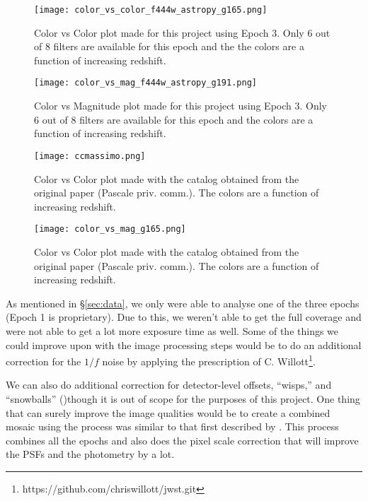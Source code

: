 \documentclass[twocolumn,linenumbers]{aastex631}
\newcommand{\todo}[1]{\texttt{TODO: #1}}
\begin{document}
\begin{figure}[h]
    \centering
    \texttt{[image: color\_vs\_color\_f444w\_astropy\_g165.png]}
    \caption{Color vs Color plot made for this project using Epoch 3. Only 6 out of 8 filters are available for this epoch and the the colors are a function of increasing redshift.}
    \label{fig:cc302}
\end{figure}

\begin{figure}[h]
    \centering
    \texttt{[image: color\_vs\_mag\_f444w\_astropy\_g191.png]}
    \caption{Color vs Magnitude plot made for this project using Epoch 3. Only 6 out of 8 filters are available for this epoch and the colors are a function of increasing redshift.}
    \label{fig:cm302}
\end{figure}

\begin{figure}[h]
    \centering
    \texttt{[image: ccmassimo.png]}
    \caption{Color vs Color plot made with the catalog obtained from the original paper (Pascale priv. comm.). The colors are a function of increasing redshift.}
    \label{fig:ccmass}
\end{figure}

\begin{figure}[h]
    \centering
    \texttt{[image: color\_vs\_mag\_g165.png]}
    \caption{Color vs Color plot made with the catalog obtained from the original paper (Pascale priv. comm.). The colors are a function of increasing redshift.}
    \label{fig:cmmass}
\end{figure}

As mentioned in \S \ref{sec:data}, we only were able to analyse one of the three epochs (Epoch 1 is proprietary). Due to this, we weren't able to get the full coverage and were not able to get a lot more exposure time as well. Some of the things we could improve upon with the image processing steps would be to do an additional correction for the $1/f$ noise by applying the prescription of C. Willott\footnote{https://github.com/chriswillott/jwst.git}.

We can also do additional correction for detector-level offsets, ``wisps,” and ``snowballs” (\cite{robotham2018profound, robotham2023dynamic, robotham2017profit})though it is out of scope for the purposes of this project. One thing that can surely improve the image qualities would be to create a combined mosaic using the process was similar to that first described by \cite{koekemoer2011candels}. This process combines all the epochs and also does the pixel scale correction that will improve the PSFs and the photometry by a lot.
\end{document}
